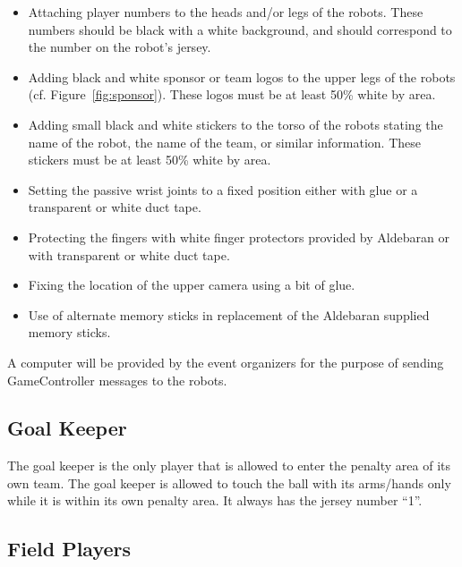 \documentclass[12pt]{article}
\newcommand{\cf}{\mbox{cf.}\xspace}
\begin{document}
\begin{itemize}

\item Attaching player numbers to the heads and/or legs of the robots.  These numbers should be black with a white background, and should correspond to the number on the robot's jersey.

\item Adding black and white sponsor or team logos to the upper legs of the robots (\cf Figure~\ref{fig:sponsor}). These logos must be at least 50\% white by area.

\item Adding small black and white stickers to the torso of the robots stating the name of the robot, the name of the team, or similar information. These stickers must be at least 50\% white by area.

\item Setting the passive wrist joints to a fixed position either with glue or a transparent or white duct tape.

\item Protecting the fingers with white finger protectors provided by Aldebaran or with transparent or white duct tape.

\item Fixing the location of the upper camera using a bit of glue. 

\item Use of alternate memory sticks in replacement of the Aldebaran supplied memory sticks.

\end{itemize}

A computer will be provided by the event organizers for the purpose of sending GameController messages to the robots.

\subsection{Goal Keeper}
\label{sec:goal_keeper}

The goal keeper is the only player that is allowed to enter the penalty area of its own team.  The goal keeper is allowed to touch the ball with its arms/hands only while it is within its own penalty area. It always has the jersey number ``1''.

\subsection{Field Players}
\label{sec:field_players}
\end{document}
